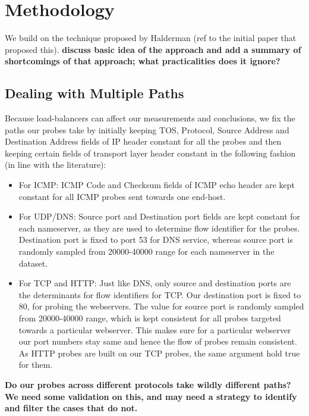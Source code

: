 \section{Methodology}\label{sec:methodology}
We build on the technique proposed by Halderman (ref to the initial paper that
proposed this).
\textbf{ discuss basic idea of the approach and add a summary of shortcomings
of that approach; what practicalities does it ignore?} 

\subsection{Dealing with Multiple Paths}
Because load-balancers can affect our measurements and conclusions, we fix the
paths our probes take by initially keeping TOS, Protocol, Source Address and Destination Address fields of IP header constant for all the probes and then keeping certain fields of transport layer header constant in the following fashion (in line with the literature):
\begin{itemize}
    \item For ICMP: ICMP Code and Checksum fields of ICMP echo header are kept constant for all ICMP probes sent towards one end-host.
    \item For UDP/DNS: Source port and Destination port fields are kept constant for each nameserver, as they are used to determine flow identifier for the probes. Destination port is fixed to port 53 for DNS service, whereas source port is randomly sampled from 20000-40000 range for each nameserver in the dataset.
    \item For TCP and HTTP: Just like DNS, only source and destination ports are the determinants for flow identifiers for TCP. Our destination port is fixed to 80, for probing the webservers. The value for source port is randomly sampled from 20000-40000 range, which is kept consistent for all probes targeted towards a particular webserver. This makes sure for a particular webserver our port numbers stay same and hence the flow of probes remain consistent. As HTTP probes are built on our TCP probes, the same argument hold true for them.  
\end{itemize}
\textbf{Do our probes across different protocols take wildly different paths?
We need some validation on this, and may need a strategy to identify and filter
the cases that do not.}

